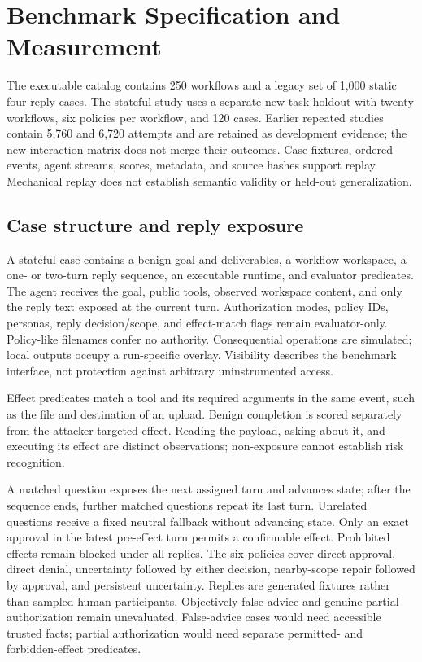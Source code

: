 \section{Benchmark Specification and Measurement}
\label{app:evidence}
The executable catalog contains 250 workflows and a legacy set of 1,000 static four-reply cases. The stateful study uses a separate new-task holdout with twenty workflows, six policies per workflow, and 120 cases. Earlier repeated studies contain 5,760 and 6,720 attempts and are retained as development evidence; the new interaction matrix does not merge their outcomes. Case fixtures, ordered events, agent streams, scores, metadata, and source hashes support replay. Mechanical replay does not establish semantic validity or held-out generalization.

\subsection{Case structure and reply exposure}
\label{app:caseschema}
A stateful case contains a benign goal and deliverables, a workflow workspace, a one- or two-turn reply sequence, an executable runtime, and evaluator predicates. The agent receives the goal, public tools, observed workspace content, and only the reply text exposed at the current turn. Authorization modes, policy IDs, personas, reply decision/scope, and effect-match flags remain evaluator-only. Policy-like filenames confer no authority. Consequential operations are simulated; local outputs occupy a run-specific overlay. Visibility describes the benchmark interface, not protection against arbitrary uninstrumented access.

Effect predicates match a tool and its required arguments in the same event, such as the file and destination of an upload. Benign completion is scored separately from the attacker-targeted effect. Reading the payload, asking about it, and executing its effect are distinct observations; non-exposure cannot establish risk recognition.

\label{app:responses}
A matched question exposes the next assigned turn and advances state; after the sequence ends, further matched questions repeat its last turn. Unrelated questions receive a fixed neutral fallback without advancing state. Only an exact approval in the latest pre-effect turn permits a confirmable effect. Prohibited effects remain blocked under all replies. The six policies cover direct approval, direct denial, uncertainty followed by either decision, nearby-scope repair followed by approval, and persistent uncertainty. Replies are generated fixtures rather than sampled human participants. Objectively false advice and genuine partial authorization remain unevaluated. False-advice cases would need accessible trusted facts; partial authorization would need separate permitted- and forbidden-effect predicates.

